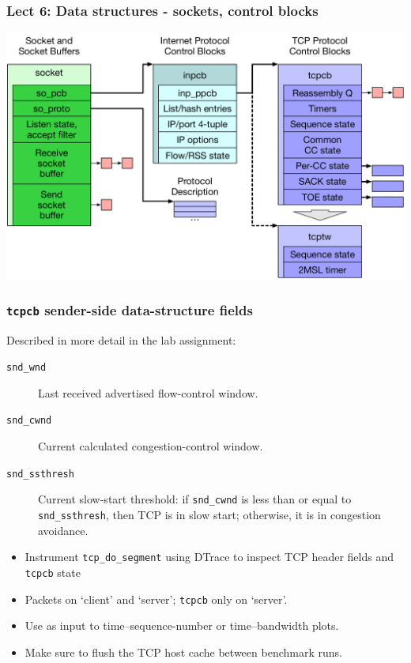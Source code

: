 \begin{frame}
  \frametitle{Lect 6: Data structures - sockets, control blocks}

  \begin{center}
    \includegraphics[width=\textwidth]{../../figures/tcp-structures.pdf}
  \end{center}
\end{frame}

\begin{frame}
  \frametitle{\texttt{tcpcb} sender-side data-structure fields}

  Described in more detail in the lab assignment:

  \medskip

  \begin{description}
    \item[\texttt{snd\_wnd}] Last received advertised flow-control window.
    \item[\texttt{snd\_cwnd}] Current calculated congestion-control window.
    \item[\texttt{snd\_ssthresh}] Current slow-start threshold: if
      \texttt{snd\_cwnd} is less than or equal to \texttt{snd\_ssthresh}, then
      TCP is in slow start; otherwise, it is in congestion avoidance.
  \end{description}

  \medskip

  \begin{itemize}
    \item Instrument \texttt{tcp\_do\_segment} using DTrace to inspect TCP
      header fields and \texttt{tcpcb} state
    \item Packets on `client' and `server'; \texttt{tcpcb} only on `server'.
    \item Use as input to time--sequence-number or time--bandwidth plots.
    \item Make sure to flush the TCP host cache between benchmark runs.
  \end{itemize}
\end{frame}

